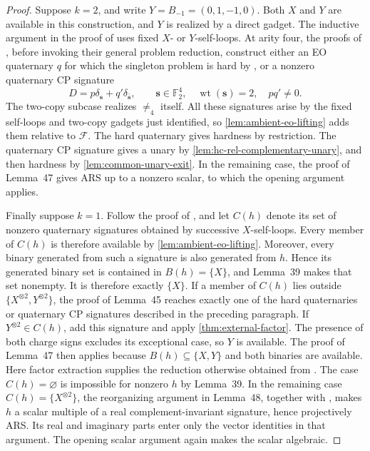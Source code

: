 \documentclass[11pt,letterpaper,onecolumn]{article}
\theoremstyle{plain}
\theoremstyle{definition}
\theoremstyle{remark}
\newcommand{\Ftwo}{\mathbb F_2}
\newcommand{\cF}{\mathcal F}
\newcommand{\wt}{\operatorname{wt}}
\newcommand{\Neq}{\neq}
\begin{document}
\begin{proof}
		Suppose \(k=2\), and write \(Y=B_{-1}=(0,1,-1,0)\).  Both \(X\) and \(Y\)
		are available in this construction, and \(Y\) is realized by a direct
        gadget. The inductive argument in the proof of
        \cite[Lemma~47]{MengWangXia2025EO} uses fixed \(X\)- or
        \(Y\)-self-loops. At arity four, the proofs of
		\cite[Lemmas~45--46]{MengWangXia2025EO}, before invoking their general
		problem reduction, construct either an EO quaternary
		\(q\) for which the singleton problem is hard by
		\cite[Theorem~3.1]{CaiFuXia2018}, or a nonzero quaternary CP signature
		\[
		D=p\delta_{\mathbf s}+q'\delta_{\bar {\mathbf s}},
		\qquad {\mathbf s}\in\Ftwo^4,\quad\wt({\mathbf s})=2,\quad pq'\ne0.
		\]
		The two-copy subcase realizes \(\Neq_4\) itself.  All these signatures arise
		by the fixed self-loops and two-copy gadgets just identified, so
		\cref{lem:ambient-eo-lifting} adds them relative to \(\cF\).  The hard
		quaternary gives hardness by restriction.  The quaternary CP signature gives a
		unary by \cref{lem:hc-rel-complementary-unary}, and then hardness by
		\cref{lem:common-unary-exit}.  In the remaining case, the proof of
		Lemma~47 gives ARS up to a nonzero scalar, to which the opening argument applies.
		
		Finally suppose \(k=1\).  Follow the proof of
		\cite[Lemma~48]{MengWangXia2025EO}, and let \(C(h)\) denote its set of
		nonzero quaternary signatures obtained by successive \(X\)-self-loops.
		Every member of \(C(h)\) is therefore available by
		\cref{lem:ambient-eo-lifting}.  Moreover, every binary generated from such a
		signature is also generated from \(h\).  Hence its generated binary set is
		contained in \(B(h)=\{X\}\), and Lemma~39 makes that set nonempty. It is
		therefore exactly \(\{X\}\).  If a member of \(C(h)\) lies outside
		\(\{X^{\otimes2},Y^{\otimes2}\}\), the proof of Lemma~45 reaches exactly
		one of the hard quaternaries or quaternary CP signatures described in the preceding
		paragraph.  If \(Y^{\otimes2}\in C(h)\), add this signature and apply
		\cref{thm:external-factor}.  The presence of both charge signs excludes its exceptional case, so
		\(Y\) is available. The proof of Lemma~47 then applies because
        \(B(h)\subseteq\{X,Y\}\) and both binaries are available. Here factor
        extraction supplies the reduction otherwise obtained from
        \cite[Lemma~38]{MengWangXia2025EO}. The case \(C(h)=\varnothing\) is
		impossible for nonzero \(h\) by Lemma~39.  In the remaining case
		\(C(h)=\{X^{\otimes2}\}\), the reorganizing argument in Lemma~48, together
		with \cite[Lemma~43]{MengWangXia2025EO}, makes \(h\) a scalar multiple of a
		real complement-invariant signature, hence projectively ARS.  Its real and
		imaginary parts enter only the vector identities in that argument.  The opening scalar argument again
		makes the scalar algebraic.
	\end{proof}
	
\end{document}
